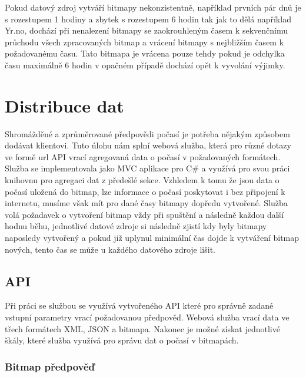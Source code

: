 \documentclass[czech,bachelor,dept460,male,csharp,cpdeclaration]{diploma}
\begin{document}
	Pokud datový zdroj vytváří bitmapy nekonzistentně, například prvních pár dnů je s rozestupem 1 hodiny a zbytek s rozestupem 6 hodin tak jak to dělá například Yr.no, dochází při nenalezení bitmapy se zaokrouhleným časem k sekvenčnímu průchodu všech zpracovaných bitmap a vrácení bitmapy s nejbližším časem k požadovanému času. Tato bitmapa je vrácena pouze tehdy pokud je odchylka času maximálně 6 hodin v opačném případě dochází opět k vyvolání výjimky.
	
	\chapter{Distribuce dat}
	
	Shromážděné a zprůměrované předpovědi počasí je potřeba nějakým způsobem dodávat klientovi. Tuto úlohu nám splní webová služba, která pro různé dotazy ve formě url API vrací agregovaná data o počasí v požadovaných formátech. Služba se implementovala jako MVC aplikace pro C\# a využívá pro svou práci knihovnu pro agregaci dat z předešlé sekce. Vzhledem k tomu že jsou data o počasí uložená do bitmap, lze informace o počasí poskytovat i bez připojení k internetu, musíme však mít pro dané časy bitmapy dopředu vytvořené. Služba volá požadavek o vytvoření bitmap vždy při spuštění a následně každou další hodnu běhu, jednotlivé datové zdroje si následně zjistí kdy byly bitmapy naposledy vytvořený a pokud již uplynul minimální čas dojde k vytváření bitmap nových, tento čas se může u každého datového zdroje lišit.
	
	\section{API}
	
	Při práci se službou se využívá vytvořeného API které pro správně zadané vstupní parametry vrací požadovanou předpověď. Webová služba vrací data ve třech formátech XML, JSON a bitmapa. Nakonec je možné získat jednotlivé škály, které služba využívá pro správu dat o počasí v bitmapách.
	
	\subsection{Bitmap předpověď}
	
\end{document}
